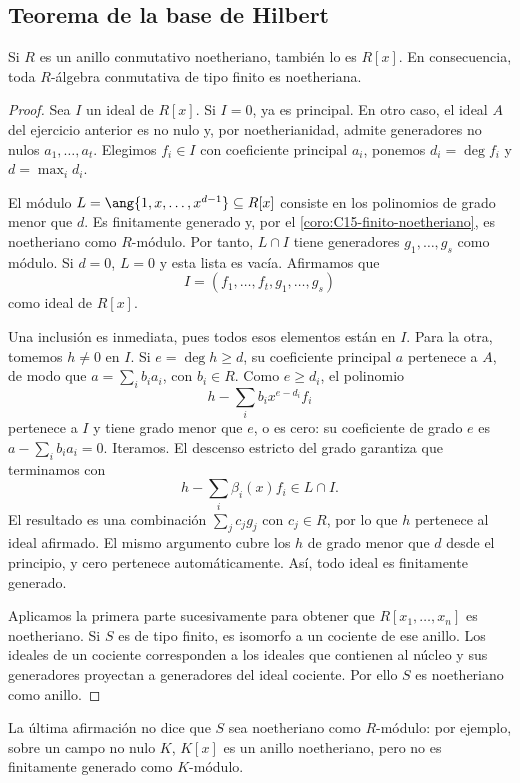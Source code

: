 \subsection{Teorema de la base de Hilbert}
\begin{teo}\label{teo:C15-Hilbert}
Si $R$ es un anillo conmutativo noetheriano, también lo es $R[x]$. En consecuencia, toda $R$-álgebra conmutativa de tipo finito es noetheriana.
\end{teo}
\begin{proof}
Sea $I$ un ideal de $R[x]$. Si $I=0$, ya es principal. En otro caso, el ideal $A$ del ejercicio anterior es no nulo y, por noetherianidad, admite generadores no nulos $a_1,\ldots,a_t$. Elegimos $f_i\in I$ con coeficiente principal $a_i$, ponemos $d_i=\deg f_i$ y $d=\max_i d_i$.

El módulo $L=\ang{1,x,\ldots,x^{d-1}}\subseteq R[x]$ consiste en los polinomios de grado menor que $d$. Es finitamente generado y, por el \cref{coro:C15-finito-noetheriano}, es noetheriano como $R$-módulo. Por tanto, $L\cap I$ tiene generadores $g_1,\ldots,g_s$ como módulo. Si $d=0$, $L=0$ y esta lista es vacía. Afirmamos que
\[
I=(f_1,\ldots,f_t,g_1,\ldots,g_s)
\]
como ideal de $R[x]$.

Una inclusión es inmediata, pues todos esos elementos están en $I$. Para la otra, tomemos $h\ne0$ en $I$. Si $e=\deg h\geq d$, su coeficiente principal $a$ pertenece a $A$, de modo que $a=\sum_i b_ia_i$, con $b_i\in R$. Como $e\geq d_i$, el polinomio
\[
h-\sum_i b_ix^{e-d_i}f_i
\]
pertenece a $I$ y tiene grado menor que $e$, o es cero: su coeficiente de grado $e$ es $a-\sum_i b_ia_i=0$. Iteramos. El descenso estricto del grado garantiza que terminamos con
\[
h-\sum_i\beta_i(x)f_i\in L\cap I.
\]
El resultado es una combinación $\sum_j c_jg_j$ con $c_j\in R$, por lo que $h$ pertenece al ideal afirmado. El mismo argumento cubre los $h$ de grado menor que $d$ desde el principio, y cero pertenece automáticamente. Así, todo ideal es finitamente generado.

Aplicamos la primera parte sucesivamente para obtener que $R[x_1,\ldots,x_n]$ es noetheriano. Si $S$ es de tipo finito, es isomorfo a un cociente de ese anillo. Los ideales de un cociente corresponden a los ideales que contienen al núcleo y sus generadores proyectan a generadores del ideal cociente. Por ello $S$ es noetheriano como anillo.
\end{proof}
La última afirmación no dice que $S$ sea noetheriano como $R$-módulo: por ejemplo, sobre un campo no nulo $K$, $K[x]$ es un anillo noetheriano, pero no es finitamente generado como $K$-módulo.

